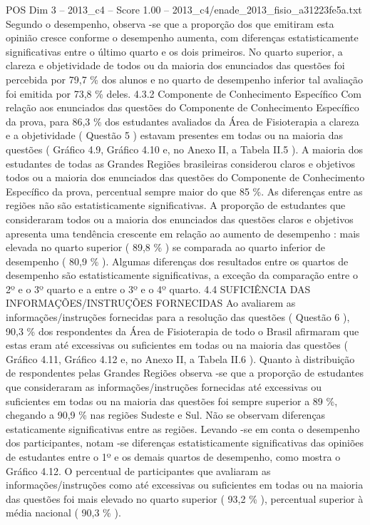 \begin{textsample}{POS Dim 3 – 2013\_c4 – Score 1.00 – 2013\_c4/enade\_2013\_fisio\_a31223fe5a.txt}
Segundo o desempenho, observa -se que a proporção dos que emitiram esta opinião cresce conforme o desempenho aumenta, com diferenças estatisticamente significativas entre o último quarto e os dois primeiros.
No quarto superior, a clareza e objetividade de todos ou da maioria dos enunciados das questões foi percebida por 79,7 \% dos alunos e no quarto de desempenho inferior tal avaliação foi emitida por 73,8 \% deles. 4.3.2 Componente de Conhecimento Específico Com relação aos enunciados das questões do Componente de Conhecimento Específico da prova, para 86,3 \% dos estudantes avaliados da Área de Fisioterapia a clareza e a objetividade ( Questão 5 ) estavam presentes em todas ou na maioria das questões ( Gráfico 4.9, Gráfico 4.10 e, no Anexo II, a Tabela II.5 ).
A maioria dos estudantes de todas as Grandes Regiões brasileiras considerou claros e objetivos todos ou a maioria dos enunciados das questões do Componente de Conhecimento Específico da prova, percentual sempre maior do que 85 \%.
As diferenças entre as regiões não são estatisticamente significativas.
A proporção de estudantes que consideraram todos ou a maioria dos enunciados das questões claros e objetivos apresenta uma tendência crescente em relação ao aumento de desempenho : mais elevada no quarto superior ( 89,8 \% ) se comparada ao quarto inferior de desempenho ( 80,9 \% ).
Algumas diferenças dos resultados entre os quartos de desempenho são estatisticamente significativas, a exceção da comparação entre o 2º e o 3º quarto e a entre o 3º e o 4º quarto. 4.4 SUFICIÊNCIA DAS INFORMAÇÕES/INSTRUÇÕES FORNECIDAS Ao avaliarem as informações/instruções fornecidas para a resolução das questões ( Questão 6 ), 90,3 \% dos respondentes da Área de Fisioterapia de todo o Brasil afirmaram que estas eram até excessivas ou suficientes em todas ou na maioria das questões ( Gráfico 4.11, Gráfico 4.12 e, no Anexo II, a Tabela II.6 ).
Quanto à distribuição de respondentes pelas Grandes Regiões observa -se que a proporção de estudantes que consideraram as informações/instruções fornecidas até excessivas ou suficientes em todas ou na maioria das questões foi sempre superior a 89 \%, chegando a 90,9 \% nas regiões Sudeste e Sul.
Não se observam diferenças estaticamente significativas entre as regiões.
Levando -se em conta o desempenho dos participantes, notam -se diferenças estatisticamente significativas das opiniões de estudantes entre o 1º e os demais quartos de desempenho, como mostra o Gráfico 4.12.
O percentual de participantes que avaliaram as informações/instruções como até excessivas ou suficientes em todas ou na maioria das questões foi mais elevado no quarto superior ( 93,2 \% ), percentual superior à média nacional ( 90,3 \% ).

\end{textsample}
